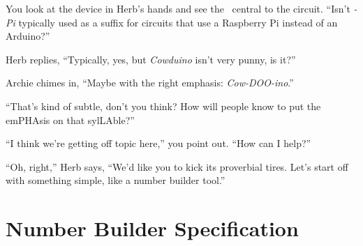 You look at the device in Herb's hands and see the \nano\ central to the circuit. ``Isn't \textit{-Pi} typically used as a suffix for circuits that use a Raspberry Pi instead of an Arduino?''

Herb replies, ``Typically, yes, but \textit{Cowduino} isn't very punny, is it?''

Archie chimes in, ``Maybe with the right emphasis: \textit{Cow-DOO-ino}.''

``That's kind of subtle, don't you think? How will people know to put the
emPHAsis on that sylLAble?''

``I think we're getting off topic here,'' you point out. ``How can I help?''

``Oh, right,'' Herb says, ``We'd like you to kick its proverbial tires. Let's
start off with something simple, like a number builder tool.''

\section{Number Builder Specification} \label{sec:FunctionalSpecification}

